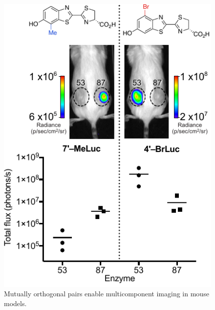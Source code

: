 \documentclass[11pt]{article}
\begin{document}
\begin{figure}
\vspace{-0.2in}
\begin{centering}
\includegraphics[width=\textwidth]{figures/just_mice.pdf}

\end{centering}
\footnotesize
\caption{\label{figure:mice}
Mutually orthogonal pairs enable multicomponent imaging in mouse models.
}
\end{figure}
\end{document}

